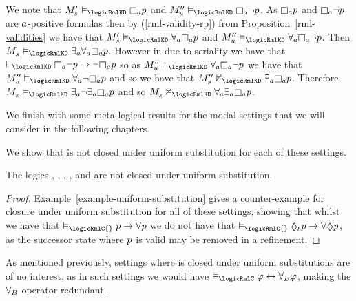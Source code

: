 \begin{example}
We note that $\kPModelP{\kStateS} \entails_\logicRmlKD\necessaryA \atomP$ and $\kPModelPP{\kStateU} \entails_\logicRmlKD\necessaryA \lnot \atomP$.
As $\necessaryA \atomP$ and $\necessaryA \lnot \atomP$ are $a$-positive formulas then by (\ref{rml-validity-rp}) from Proposition~\ref{rml-validities} we have that $\kPModelP{\kStateS} \entails_\logicRmlKD\allrefsA \necessaryA \atomP$ and $\kPModelPP{\kStateU} \entails_\logicRmlKD\allrefsA \necessaryA \lnot \atomP$.
Then $\kPModel{\kStateS} \entails_\logicRmlKD\somerefsA \allrefsA \necessaryA \atomP$.
However in \classKD{} due to seriality we have that $\entails_\logicRmlKD\necessaryA \lnot \atomP \implies \lnot \necessaryA \atomP$ so as $\kPModelPP{\kStateU} \entails_\logicRmlKD\allrefsA \necessaryA \lnot \atomP$ we have that $\kPModelPP{\kStateU} \entails_\logicRmlKD\allrefsA \lnot \necessaryA \atomP$ and so we have that $\kPModelPP{\kStateS} \nentails_\logicRmlKD\somerefsA \necessaryA \atomP$.
Therefore $\kPModel{\kStateS} \entails_\logicRmlKD\somerefsA \lnot \somerefsA \necessaryA \atomP$ and so $\kPModel{\kStateS} \nentails_\logicRmlKD\allrefsA \somerefsA \necessaryA \atomP$.
\end{example}

We finish with some meta-logical results for the modal settings that we will consider in the following chapters.

We show that \logicRml{} is not closed under uniform substitution for each of these settings.

\begin{proposition}
The logics \logicRmlK{}, \logicRmlKF{}, \logicRmlKFF{}, \logicRmlKD{}, and \logicRmlS{} are not closed under uniform substitution.
\end{proposition}

\begin{proof}
Example~\ref{example-uniform-substitution} gives a counter-example for closure under uniform substitution for all of these settings, showing that whilst we have that $\entails_\logicRmlC{} \atomP \implies \allrefs \atomP$ we do not have that $\entails_\logicRmlC{} \possibleB \atomP \implies \allrefs \possible \atomP$, as the successor state where $p$ is valid may be removed in a refinement.
\end{proof}

As mentioned previously, settings where \logicRml{} is closed under uniform substitutions are of no interest, as in such settings we would have $\entails_\logicRmlC \phi \iff \allrefsBs \phi$, making the ${\forall_{B}}$ operator redundant.

